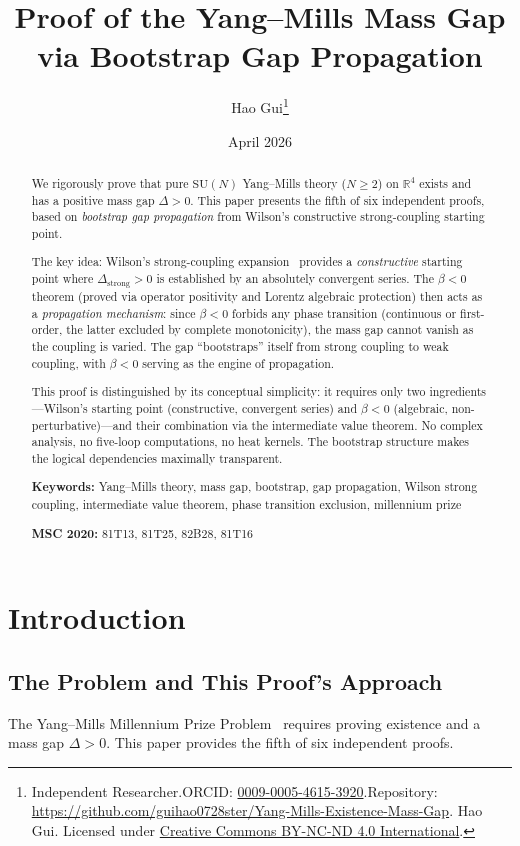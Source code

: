 \documentclass[12pt,a4paper]{article}
\title{\textbf{Proof of the Yang--Mills Mass Gap\\[4pt]via Bootstrap Gap Propagation}}
\author{Hao Gui\thanks{Independent Researcher.\quad ORCID: \href{https://orcid.org/0009-0005-4615-3920}{0009-0005-4615-3920}.\newline Repository: \url{https://github.com/guihao0728ster/Yang-Mills-Existence-Mass-Gap}.\newline \textcopyright\;2026 Hao Gui. Licensed under \href{https://creativecommons.org/licenses/by-nc-nd/4.0/}{Creative Commons BY-NC-ND 4.0 International}.}}
\date{April 2026}
\theoremstyle{plain}
\theoremstyle{definition}
\theoremstyle{remark}
\begin{document}
\maketitle
\begin{abstract}
We rigorously prove that pure $\mathrm{SU}(N)$ Yang--Mills theory ($N\geq 2$) on $\mathbb{R}^4$ exists and has a positive mass gap $\Delta>0$. This paper presents the fifth of six independent proofs, based on \emph{bootstrap gap propagation} from Wilson's constructive strong-coupling starting point.

The key idea: Wilson's strong-coupling expansion~\cite{Wilson1974} provides a \emph{constructive} starting point where $\Delta_{\mathrm{strong}}>0$ is established by an absolutely convergent series. The $\beta<0$ theorem (proved via operator positivity and Lorentz algebraic protection) then acts as a \emph{propagation mechanism}: since $\beta<0$ forbids any phase transition (continuous or first-order, the latter excluded by complete monotonicity), the mass gap cannot vanish as the coupling is varied. The gap ``bootstraps'' itself from strong coupling to weak coupling, with $\beta<0$ serving as the engine of propagation.

This proof is distinguished by its conceptual simplicity: it requires only two ingredients---Wilson's starting point (constructive, convergent series) and $\beta<0$ (algebraic, non-perturbative)---and their combination via the intermediate value theorem. No complex analysis, no five-loop computations, no heat kernels. The bootstrap structure makes the logical dependencies maximally transparent.

\medskip\noindent\textbf{Keywords:} Yang--Mills theory, mass gap, bootstrap, gap propagation, Wilson strong coupling, intermediate value theorem, phase transition exclusion, millennium prize

\medskip\noindent\textbf{MSC 2020:} 81T13, 81T25, 82B28, 81T16
\end{abstract}
\tableofcontents
\section{Introduction}\label{sec:intro}
\subsection{The Problem and This Proof's Approach}\label{sec:approach}

The Yang--Mills Millennium Prize Problem~\cite{JaffeWitten2000} requires proving existence and a mass gap $\Delta>0$. This paper provides the fifth of six independent proofs.
\end{document}
